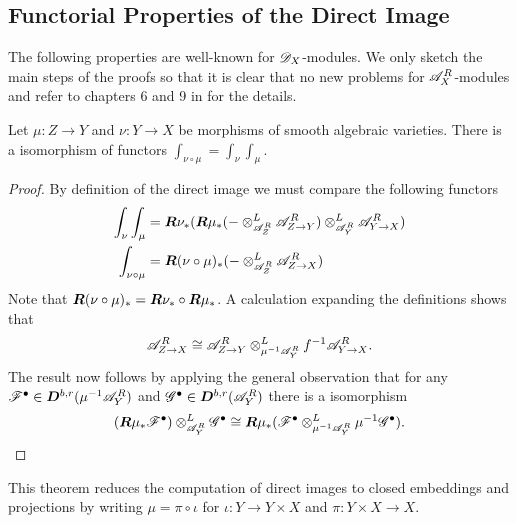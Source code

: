     \subsection{Functorial Properties of the Direct Image}
    The following properties are well-known for $\mathscr{D}_X$-modules.
    We only sketch the main steps of the proofs so that it is clear that no new problems for $\mathscr{A}_X^R$-modules and refer to chapters 6 and 9 in  \cite{borel1987algebraic} for the details.
    \begin{theorem}
       Let $\mu:Z\to Y$ and $\nu:Y\to X$ be morphisms of smooth algebraic varieties. There is a isomorphism of functors $\int_{\nu\circ \mu} = \int_\nu \int_\mu$.
    \end{theorem}
    \begin{proof}
      By definition of the direct image we must compare the following functors
      \begin{align*}
        \int_\nu \int_\mu &= \boldsymbol{R} \nu_* (\boldsymbol{R} \mu_* ({-} \otimes^L_{\mathscr{A}_Z^R} \mathscr{A}_{Z \to Y}^R)\otimes^L_{\mathscr{A}_Y^R} \mathscr{A}_{Y\to X}^R)\\
        \int_{\nu \circ \mu} &= \boldsymbol{R}(\nu \circ \mu)_*({-} \otimes_{\mathscr{A}_Z^R}^L \mathscr{A}_{Z\to X}^R)
      \end{align*}
      Note that $\boldsymbol{R}(\nu \circ \mu)_* = \boldsymbol{R}\nu_* \circ \boldsymbol{R}\mu_* $. A calculation expanding the definitions shows that $$\mathscr{A}_{Z\to X}^R \cong \mathscr{A}_{Z \to Y}^R \otimes^L_{\mu^{-1}\mathscr{A}_Y^R} f^{-1} \mathscr{A}_{Y\to X}^R.$$
      The result now follows by applying the general observation that for any $\mathscr{F}^\bullet \in \boldsymbol{D}^{b,r}(\mu^{-1}\mathscr{A}_Y^R)$ and $\mathscr{G}^\bullet \in \boldsymbol{D}^{b,r}(\mathscr{A}_Y^R)$ there is a isomorphism
      $$(\boldsymbol{R} \mu_* \mathscr{F}^\bullet) \otimes^L_{\mathscr{A}_Y^R} \mathscr{G}^\bullet \cong \boldsymbol{R} \mu_*(\mathscr{F}^\bullet \otimes^L_{\mu^{-1}\mathscr{A}_Y^R} \mu^{-1}\mathscr{G}^\bullet).$$
    \end{proof}
    This theorem reduces the computation of direct images to closed embeddings and projections by writing $\mu = \pi \circ \iota$ for $\iota:Y\to Y\times X$ and $\pi:Y\times X\to X$.



